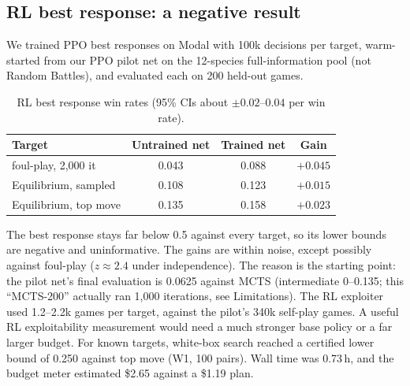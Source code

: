 \documentclass[10pt]{article}
\theoremstyle{plain}
\theoremstyle{definition}
\theoremstyle{remark}
\begin{document}
\subsection{RL best response: a negative result}
\label{sec:exp-rl}
We trained PPO best responses on Modal with 100k decisions per target, warm-started from our PPO pilot net on the 12-species full-information pool (not Random Battles), and evaluated each on 200 held-out games.
\begin{table}[h]
\centering\small
\caption{RL best response win rates (95\% CIs about $\pm0.02$--$0.04$ per win rate).}
\label{tab:rl}
\begin{tabular}{@{}lccc@{}}
\toprule
Target & Untrained net & Trained net & Gain \\
\midrule
foul-play, 2,000 it & 0.043 & 0.088 & $+0.045$ \\
Equilibrium, sampled & 0.108 & 0.123 & $+0.015$ \\
Equilibrium, top move & 0.135 & 0.158 & $+0.023$ \\
\bottomrule
\end{tabular}
\vspace{-0.6em}
\end{table}
The best response stays far below 0.5 against every target, so its lower bounds are negative and uninformative. The gains are within noise, except possibly against foul-play ($z\approx2.4$ under independence). The reason is the starting point: the pilot net's final evaluation is 0.0625 against MCTS (intermediate 0--0.135; this ``MCTS-200'' actually ran 1,000 iterations, see Limitations). The RL exploiter used 1.2--2.2k games per target, against the pilot's 340k self-play games. A useful RL exploitability measurement would need a much stronger base policy or a far larger budget. For known targets, white-box search reached a certified lower bound of 0.250 against top move (W1, 100 pairs). Wall time was 0.73\,h, and the budget meter estimated \$2.65 against a \$1.19 plan.
\end{document}
